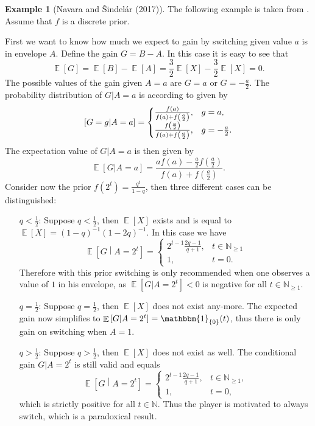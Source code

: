 \documentclass[a4paper]{report}
\theoremstyle{plain}
\theoremstyle{definition}
\newtheorem{example}[theorem]{Example}
\theoremstyle{remark}
\numberwithin{equation}{chapter}
\newcommand{\N}{\mathbb{N}}
\let\P\relax
\DeclareMathOperator{\P}{\mathbb{P}}
\DeclareMathOperator{\E}{\mathbb{E}}
\DeclareMathOperator{\1}{\mathbbm{1}}
\begin{document}
\begin{example}[Navara and Šindelár (2017)]\label{ex:EnvelopePriorGain}
The following example is taken from \cite{Navara17}. Assume that $f$ is a discrete prior.

First we want to know how much we expect to gain by switching given value $a$ is in envelope $A$. Define the gain $G=B-A$. In this case it is easy to see that
\begin{equation}
\E[G]=\E[B]-\E[A]=\frac{3}{2}\E[X]-\frac{3}{2}\E[X]=0.
\end{equation}
The possible values of the gain given $A=a$ are $G=a$ or $G=-\frac{a}{2}$. The probability distribution of $G|A=a$ is according to \cite{Navara17} given by
\begin{equation}
\P[G=g|A=a]=\begin{cases}
\frac{f(a)}{f(a)+f\left(\frac{a}{2}\right)},&g=a,\\
\frac{f\left(\frac{a}{2}\right)}{f(a)+f\left(\frac{a}{2}\right)},&g=-\frac{a}{2}.
\end{cases}
\end{equation}
The expectation value of $G|A=a$ is then given by
\begin{equation}
\E[G|A=a]=\frac{af(a)-\frac{a}{2}f\left(\frac{a}{2}\right)}{f(a)+f\left(\frac{a}{2}\right)}.
\end{equation}
Consider now the prior $f(2^t)=\frac{q^t}{1-q}$, then three different cases can be distinguished:
\begin{enumerate}
    \item[$q<\frac{1}{2}$:] Suppose $q<\frac{1}{2}$, then $\E[X]$ exists and is equal to $\E[X]=(1-q)^{-1}(1-2q)^{-1}$. In this case we have
    \begin{equation}
    \E\left[G\middle|A=2^t\right]=\begin{cases}2^{t-1}\frac{2q-1}{q+1},&t\in\N_{\geq 1}\\1,&t=0.\end{cases}
    \end{equation}
    Therefore with this prior switching is only recommended when one observes a value of $1$ in his envelope, as $\E[G|A=2^t]<0$ is negative for all $t\in\N_{\geq 1}$.
    \item[$q=\frac{1}{2}$:] Suppose $q=\frac{1}{2}$, then $\E[X]$ does not exist any-more. The expected gain now simplifies to $\E\left[G\middle|A=2^t\right]=\1_{\{0\}}(t)$, thus there is only gain on switching when $A=1$.
    \item[$q>\frac{1}{2}$:] Suppose $q>\frac{1}{2}$, then $\E[X]$ does not exist as well. The conditional gain $G|A=2^t$ is still valid and equals
    \begin{equation}
    \E\left[G\middle|A=2^t\right]=\begin{cases}2^{t-1}\frac{2q-1}{q+1},&t\in\N_{\geq 1},\\1,&t=0,\end{cases}
    \end{equation}
    which is strictly positive for all $t\in\N$. Thus the player is motivated to always switch, which is a paradoxical result.
\end{enumerate}


\end{example}
\end{document}
